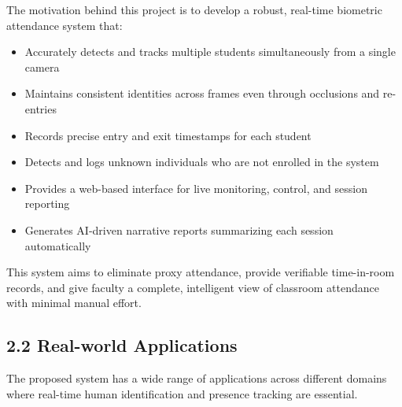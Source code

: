 \documentclass{report}
\begin{document}
The motivation behind this project is to develop a robust, real-time biometric attendance system that:

\begin{itemize}
    \item Accurately detects and tracks multiple students simultaneously from a single camera
    \item Maintains consistent identities across frames even through occlusions and re-entries
    \item Records precise entry and exit timestamps for each student
    \item Detects and logs unknown individuals who are not enrolled in the system
    \item Provides a web-based interface for live monitoring, control, and session reporting
    \item Generates AI-driven narrative reports summarizing each session automatically
\end{itemize}

This system aims to eliminate proxy attendance, provide verifiable time-in-room records, and give\vspace{3pt} faculty a complete, intelligent view of classroom attendance with minimal manual effort.

\subsection*{2.2 Real-world Applications}
The proposed system has a wide range of applications across different domains where real-time human\vspace{3pt} identification and presence tracking are essential.
\end{document}
